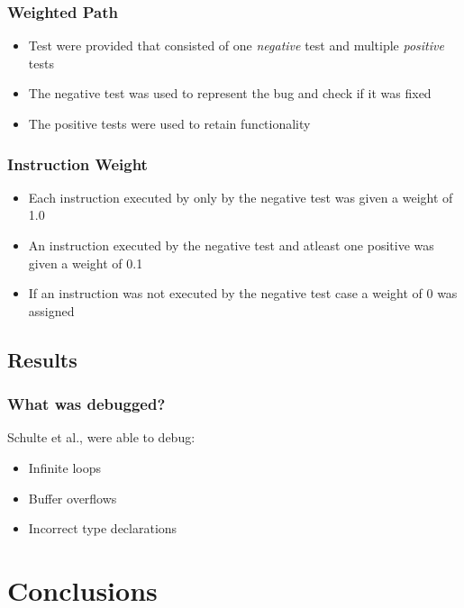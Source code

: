 \documentclass{beamer}
\begin{document}
\begin{frame}
\frametitle{Weighted Path}
\begin{itemize}

\item Test were provided that consisted of one \textit{negative} test and multiple \textit{positive} tests
   	\item The negative test was used to represent the bug and check if it was fixed
	\item The positive tests were used to retain functionality
	
\end{itemize}
\end{frame}


\begin{frame}
  \frametitle{Instruction Weight}
  
    \begin{itemize}
  	\item Each instruction executed by only by the negative test was given a  weight of 1.0
  	\item An instruction executed by the negative test and atleast one positive was given a weight of 0.1
  	\item If an instruction was not executed by the negative test case a weight of 0 was assigned 
  \end{itemize}
\end{frame}

\subsection[Results]{Results}

\begin{frame}
\frametitle{What was debugged?}
Schulte et al., were able to debug:
\begin{itemize}
\item Infinite loops
\item Buffer overflows
\item Incorrect type declarations

\end{itemize}


\end{frame}




\section[Conclusions]{Conclusions}
\end{document}
